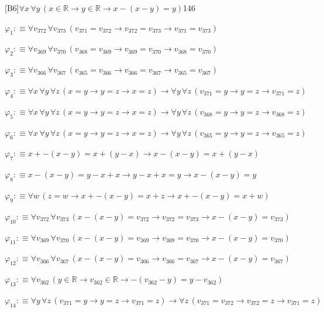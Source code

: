 \begin{fullproof}{[B6]}{$\forall x\,\forall y\,(x \in \mathbb{R} \to y \in \mathbb{R} \to x - (x - y) = y)$}{146}
\begin{ptree}
\end{ptree}
\begin{abbrevlist}
\item $\varphi_{1} :\equiv \forall v_{372}\,\forall v_{373}\,(v_{371} = v_{372} \to v_{372} = v_{373} \to v_{371} = v_{373})$
\item $\varphi_{2} :\equiv \forall v_{369}\,\forall v_{370}\,(v_{368} = v_{369} \to v_{369} = v_{370} \to v_{368} = v_{370})$
\item $\varphi_{3} :\equiv \forall v_{366}\,\forall v_{367}\,(v_{365} = v_{366} \to v_{366} = v_{367} \to v_{365} = v_{367})$
\item $\varphi_{4} :\equiv \forall x\,\forall y\,\forall z\,(x = y \to y = z \to x = z) \to \forall y\,\forall z\,(v_{371} = y \to y = z \to v_{371} = z)$
\item $\varphi_{5} :\equiv \forall x\,\forall y\,\forall z\,(x = y \to y = z \to x = z) \to \forall y\,\forall z\,(v_{368} = y \to y = z \to v_{368} = z)$
\item $\varphi_{6} :\equiv \forall x\,\forall y\,\forall z\,(x = y \to y = z \to x = z) \to \forall y\,\forall z\,(v_{365} = y \to y = z \to v_{365} = z)$
\item $\varphi_{7} :\equiv x + -(x - y) = x + (y - x) \to x - (x - y) = x + (y - x)$
\item $\varphi_{8} :\equiv x - (x - y) = y - x + x \to y - x + x = y \to x - (x - y) = y$
\item $\varphi_{9} :\equiv \forall w\,(z = w \to x + -(x - y) = x + z \to x + -(x - y) = x + w)$
\item $\varphi_{10} :\equiv \forall v_{372}\,\forall v_{373}\,(x - (x - y) = v_{372} \to v_{372} = v_{373} \to x - (x - y) = v_{373})$
\item $\varphi_{11} :\equiv \forall v_{369}\,\forall v_{370}\,(x - (x - y) = v_{369} \to v_{369} = v_{370} \to x - (x - y) = v_{370})$
\item $\varphi_{12} :\equiv \forall v_{366}\,\forall v_{367}\,(x - (x - y) = v_{366} \to v_{366} = v_{367} \to x - (x - y) = v_{367})$
\item $\varphi_{13} :\equiv \forall v_{362}\,(y \in \mathbb{R} \to v_{362} \in \mathbb{R} \to -(v_{362} - y) = y - v_{362})$
\item $\varphi_{14} :\equiv \forall y\,\forall z\,(v_{371} = y \to y = z \to v_{371} = z) \to \forall z\,(v_{371} = v_{372} \to v_{372} = z \to v_{371} = z)$

\end{abbrevlist}
\end{fullproof}
